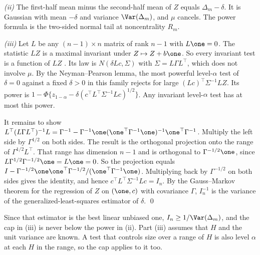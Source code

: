 \emph{(ii)} The first-half mean minus the second-half mean of $Z$ equals $\Delta_m-\delta$. It is Gaussian with mean $-\delta$ and variance $\Var(\Delta_m)$, and $\mu$ cancels. The power formula is the two-sided normal tail at noncentrality $R_m$.

\emph{(iii)} Let $L$ be any $(n-1)\times n$ matrix of rank $n-1$ with $L\one=0$. The statistic $LZ$ is a maximal invariant under $Z\mapsto Z+b\one$. So every invariant test is a function of $LZ$ \citep[Theorem~6.2.1]{lehmann2005testing}\vc. Its law is $N(\delta Lc,\Sigma)$ with $\Sigma=L\Gamma L^\top$, which does not involve $\mu$. By the Neyman--Pearson lemma, the most powerful level-$\alpha$ test of $\delta=0$ against a fixed $\delta>0$ in this family rejects for large $(Lc)^\top\Sigma^{-1}LZ$. Its power is $1-\Phi\{z_{1-\alpha}-\delta(c^\top L^\top\Sigma^{-1}Lc)^{1/2}\}$. Any invariant level-$\alpha$ test has at most this power.

It remains to show $L^\top(L\Gamma L^\top)^{-1}L=\Gamma^{-1}-\Gamma^{-1}\one(\one^\top\Gamma^{-1}\one)^{-1}\one^\top\Gamma^{-1}$. Multiply the left side by $\Gamma^{1/2}$ on both sides. The result is the orthogonal projection onto the range of $\Gamma^{1/2}L^\top$. That range has dimension $n-1$ and is orthogonal to $\Gamma^{-1/2}\one$, since $L\Gamma^{1/2}\Gamma^{-1/2}\one=L\one=0$. So the projection equals $I-\Gamma^{-1/2}\one\one^\top\Gamma^{-1/2}/(\one^\top\Gamma^{-1}\one)$. Multiplying back by $\Gamma^{-1/2}$ on both sides gives the identity, and hence $c^\top L^\top\Sigma^{-1}Lc=I_n$. By the Gauss--Markov theorem for the regression of $Z$ on $(\one,c)$ with covariance $\Gamma$, $I_n^{-1}$ is the variance of the generalized-least-squares estimator of $\delta$. \qed

Since that estimator is the best linear unbiased one, $I_n\ge1/\Var(\Delta_m)$, and the cap in (iii) is never below the power in (ii). Part (iii) assumes that $H$ and the unit variance are known. A test that controls size over a range of $H$ is also level $\alpha$ at each $H$ in the range, so the cap applies to it too.
